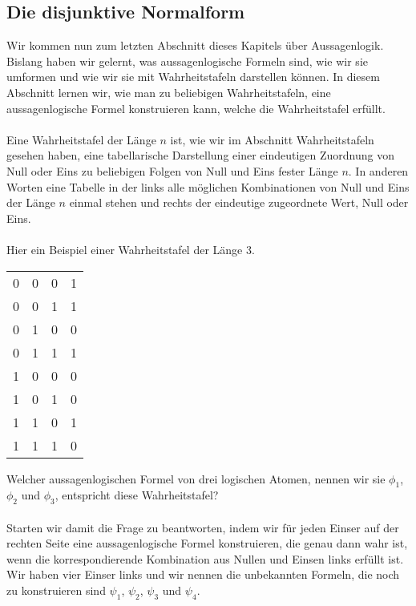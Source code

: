\documentclass[11pt,a4paper,leqno]{report}
\numberwithin{equation}{chapter}
\begin{document}
\subsection{Die disjunktive Normalform}
Wir kommen nun zum letzten Abschnitt dieses Kapitels über Aussagenlogik. Bislang haben wir gelernt, was aussagenlogische Formeln sind, wie wir sie umformen und wie wir sie mit Wahrheitstafeln darstellen können. In diesem Abschnitt lernen wir, wie man zu beliebigen Wahrheitstafeln, eine aussagenlogische Formel konstruieren kann, welche die Wahrheitstafel erfüllt.\\
\\
Eine Wahrheitstafel der Länge $n$ ist, wie wir im Abschnitt Wahrheitstafeln gesehen haben, eine tabellarische Darstellung einer eindeutigen Zuordnung von Null oder Eins zu beliebigen Folgen von Null und Eins fester Länge $n$. In anderen Worten eine Tabelle in der links alle möglichen Kombinationen von Null und Eins der Länge $n$ einmal stehen und rechts der eindeutige zugeordnete Wert, Null oder Eins.\\
\\
Hier ein Beispiel einer Wahrheitstafel der Länge 3.
\begin{center}
	\begin{tabular}{|c c c|c|}
		\hline
		0 & 0 & 0 & 1\\
		0 & 0 & 1 & 1\\
		0 & 1 & 0 & 0\\
		0 & 1 & 1 & 1\\
		1 & 0 & 0 & 0\\
		1 & 0 & 1 & 0\\
		1 & 1 & 0 & 1\\
		1 & 1 & 1 & 0\\
		\hline
	\end{tabular}  
\end{center}
Welcher aussagenlogischen Formel von drei logischen Atomen, nennen wir sie $\phi_1$, $\phi_2$ und $\phi_3$, entspricht diese Wahrheitstafel?\\
\\
Starten wir damit die Frage zu beantworten, indem wir für jeden Einser auf der rechten Seite eine aussagenlogische Formel konstruieren, die genau dann wahr ist, wenn die korrespondierende Kombination aus Nullen und Einsen links erfüllt ist.
Wir haben vier Einser links und wir nennen die unbekannten Formeln, die noch zu konstruieren sind $\psi_1$, $\psi_2$, $\psi_3$ und $\psi_4$.\\
\\
\end{document}
